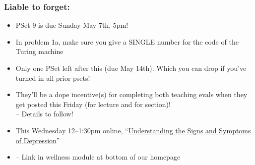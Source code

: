 \begin{frame}
\frametitle{Liable to forget:}

\begin{itemize}[<+->]


\item PSet 9 is due Sunday May 7th, 5pm!
\item[] In problem 1a, make sure you give a SINGLE number for the code of the Turing machine

\item Only one PSet left after this (due May 14th). Which you can drop if you've turned in all prior psets! 

\item They'll be a dope incentive(s) for completing both teaching evals when they get posted this Friday (for lecture and for section)! \\ -- Details to follow! 

\item This Wednesday 12--1:30pm online, ``\href{https://www.eventbrite.com/e/understanding-the-signs-and-symptoms-of-depression-tickets-514185210807}{Understanding the Signs and Symptoms of Depression}''
\item[] -- Link in wellness module at bottom of our homepage




\end{itemize}
\end{frame}


